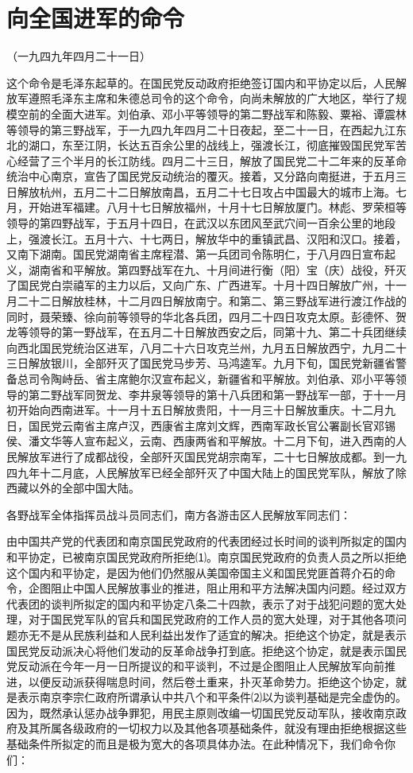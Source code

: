 \documentclass[UTF-8, a5paper, 12pt]{ctexart}
\begin{document}
\section{向全国进军的命令}

（一九四九年四月二十一日）

这个命令是毛泽东起草的。在国民党反动政府拒绝签订国内和平协定以后，人民解放军遵照毛泽东主席和朱德总司令的这个命令，向尚未解放的广大地区，举行了规模空前的全面大进军。刘伯承、邓小平等领导的第二野战军和陈毅、粟裕、谭震林等领导的第三野战军，于一九四九年四月二十日夜起，至二十一日，在西起九江东北的湖口，东至江阴，长达五百余公里的战线上，强渡长江，彻底摧毁国民党军苦心经营了三个半月的长江防线。四月二十三日，解放了国民党二十二年来的反革命统治中心南京，宣告了国民党反动统治的覆灭。接着，又分路向南挺进，于五月三日解放杭州，五月二十二日解放南昌，五月二十七日攻占中国最大的城市上海。七月，开始进军福建。八月十七日解放福州，十月十七日解放厦门。林彪、罗荣桓等领导的第四野战军，于五月十四日，在武汉以东团风至武穴间一百余公里的地段上，强渡长江。五月十六、十七两日，解放华中的重镇武昌、汉阳和汉口。接着，又南下湖南。国民党湖南省主席程潜、第一兵团司令陈明仁，于八月四日宣布起义，湖南省和平解放。第四野战军在九、十月间进行衡（阳）宝（庆）战役，歼灭了国民党白崇禧军的主力以后，又向广东、广西进军。十月十四日解放广州，十一月二十二日解放桂林，十二月四日解放南宁。和第二、第三野战军进行渡江作战的同时，聂荣臻、徐向前等领导的华北各兵团，四月二十四日攻克太原。彭德怀、贺龙等领导的第一野战军，在五月二十日解放西安之后，同第十九、第二十兵团继续向西北国民党统治区进军，八月二十六日攻克兰州，九月五日解放西宁，九月二十三日解放银川，全部歼灭了国民党马步芳、马鸿逵军。九月下旬，国民党新疆省警备总司令陶峙岳、省主席鲍尔汉宣布起义，新疆省和平解放。刘伯承、邓小平等领导的第二野战军同贺龙、李井泉等领导的第十八兵团和第一野战军一部，于十一月初开始向西南进军。十一月十五日解放贵阳，十一月三十日解放重庆。十二月九日，国民党云南省主席卢汉，西康省主席刘文辉，西南军政长官公署副长官邓锡侯、潘文华等人宣布起义，云南、西康两省和平解放。十二月下旬，进入西南的人民解放军进行了成都战役，全部歼灭国民党胡宗南军，二十七日解放成都。到一九四九年十二月底，人民解放军已经全部歼灭了中国大陆上的国民党军队，解放了除西藏以外的全部中国大陆。

各野战军全体指挥员战斗员同志们，南方各游击区人民解放军同志们：

由中国共产党的代表团和南京国民党政府的代表团经过长时间的谈判所拟定的国内和平协定，已被南京国民党政府所拒绝⑴。南京国民党政府的负责人员之所以拒绝这个国内和平协定，是因为他们仍然服从美国帝国主义和国民党匪首蒋介石的命令，企图阻止中国人民解放事业的推进，阻止用和平方法解决国内问题。经过双方代表团的谈判所拟定的国内和平协定八条二十四款，表示了对于战犯问题的宽大处理，对于国民党军队的官兵和国民党政府的工作人员的宽大处理，对于其他各项问题亦无不是从民族利益和人民利益出发作了适宜的解决。拒绝这个协定，就是表示国民党反动派决心将他们发动的反革命战争打到底。拒绝这个协定，就是表示国民党反动派在今年一月一日所提议的和平谈判，不过是企图阻止人民解放军向前推进，以便反动派获得喘息时间，然后卷土重来，扑灭革命势力。拒绝这个协定，就是表示南京李宗仁政府所谓承认中共八个和平条件⑵以为谈判基础是完全虚伪的。因为，既然承认惩办战争罪犯，用民主原则改编一切国民党反动军队，接收南京政府及其所属各级政府的一切权力以及其他各项基础条件，就没有理由拒绝根据这些基础条件所拟定的而且是极为宽大的各项具体办法。在此种情况下，我们命令你们：
\end{document}

